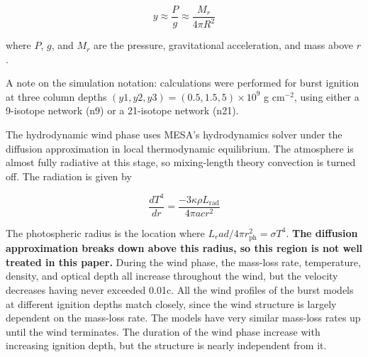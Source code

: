 \documentclass[onecolumn]{aastex63}
\begin{document}
\begin{equation}
    y \approx \frac{P}{g} \approx \frac{M_r}{4\pi R^2}
\end{equation}

where $P$, $g$, and $M_r$ are the pressure, gravitational acceleration, and mass above $r$.

A note on the simulation notation: calculations were performed for burst ignition at three column depths $(y1, y2, y3) = (0.5, 1.5, 5) \times 10^9$ g cm$^{-2}$, using either a 9-isotope network (n9) or a 21-isotope network (n21).

The hydrodynamic wind phase uses MESA's hydrodynamics solver under the diffusion approximation in local thermodynamic equilibrium. The atmosphere is almost fully radiative at this stage, so mixing-length theory convection is turned off. The radiation is given by

\begin{equation}
    \frac{dT^4}{dr} = \frac{-3\kappa \rho L_{\textrm{rad}}}{4\pi a c r^2}
\end{equation}

The photospheric radius is the location where $L_rad/4\pi r_{\textrm{ph}}^2 = \sigma T^4$. \textbf{The diffusion approximation breaks down above this radius, so this region is not well treated in this paper.} During the wind phase, the mass-loss rate, temperature, density, and optical depth all increase throughout the wind, but the velocity decreases having never exceeded 0.01c. All the wind profiles of the burst models at different ignition depths match closely, since the wind structure is largely dependent on the mass-loss rate. The models have very similar mass-loss rates up until the wind terminates. The duration of the wind phase increase with increasing ignition depth, but the structure is nearly independent from it.
\end{document}
